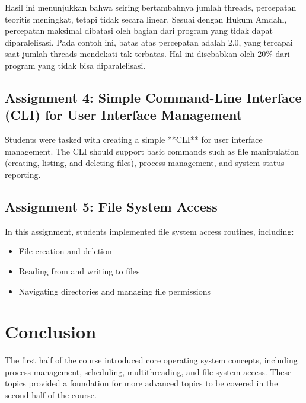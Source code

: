 \documentclass[12pt]{article}
\begin{document}
Hasil ini menunjukkan bahwa seiring bertambahnya jumlah threads, percepatan teoritis meningkat, tetapi tidak secara linear. Sesuai dengan Hukum Amdahl, percepatan maksimal dibatasi oleh bagian dari program yang tidak dapat diparalelisasi. Pada contoh ini, batas atas percepatan adalah 2.0, yang tercapai saat jumlah threads mendekati tak terbatas. Hal ini disebabkan oleh 20\% dari program yang tidak bisa diparalelisasi.

\subsection{Assignment 4: Simple Command-Line Interface (CLI) for User Interface Management}
Students were tasked with creating a simple **CLI** for user interface management. The CLI should support basic commands such as file manipulation (creating, listing, and deleting files), process management, and system status reporting.

\subsection{Assignment 5: File System Access}
In this assignment, students implemented file system access routines, including:
\begin{itemize}
    \item File creation and deletion
    \item Reading from and writing to files
    \item Navigating directories and managing file permissions
\end{itemize}

\section{Conclusion}
The first half of the course introduced core operating system concepts, including process management, scheduling, multithreading, and file system access. These topics provided a foundation for more advanced topics to be covered in the second half of the course.
\end{document}
